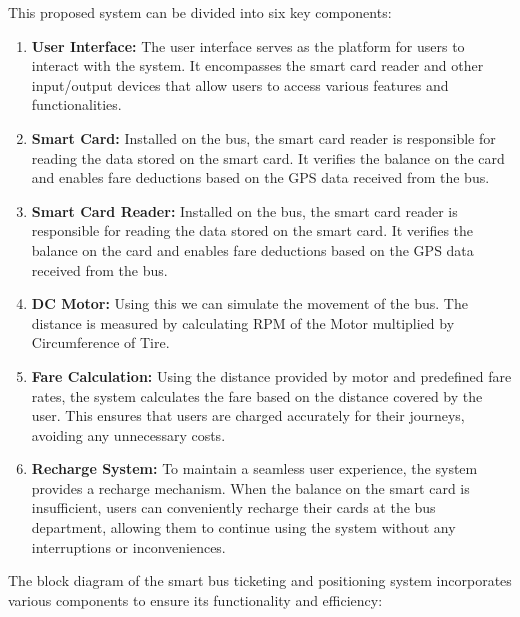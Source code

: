 \documentclass[conference]{IEEEtran}
\begin{document}
This proposed system can be divided into six key components:

  \begin{enumerate}
    \item \textbf{User Interface: } The user interface serves as the platform for users to interact with the system. It encompasses the smart card reader and other input/output devices that allow users to access various features and functionalities.
    \item \textbf{Smart Card: } Installed on the bus, the smart card reader is responsible for reading the data stored on the smart card. It verifies the balance on the card and enables fare deductions based on the GPS data received from the bus.
    \item \textbf{Smart Card Reader: } Installed on the bus, the smart card reader is responsible for reading the data stored on the smart card. It verifies the balance on the card and enables fare deductions based on the GPS data received from the bus.
    \item \textbf{DC Motor: } Using this we can simulate the movement of the bus. The distance is measured by calculating RPM of the Motor multiplied by Circumference of Tire.
    \item \textbf{Fare Calculation: } Using the distance provided by motor and predefined fare rates, the system calculates the fare based on the distance covered by the user. This ensures that users are charged accurately for their journeys, avoiding any unnecessary costs.
    \item \textbf{Recharge System: } To maintain a seamless user experience, the system provides a recharge mechanism. When the balance on the smart card is insufficient, users can conveniently recharge their cards at the bus department, allowing them to continue using the system without any interruptions or inconveniences.
  \end{enumerate}
  The block diagram of the smart bus ticketing and positioning system incorporates various components to ensure its functionality and efficiency:
\end{document}
